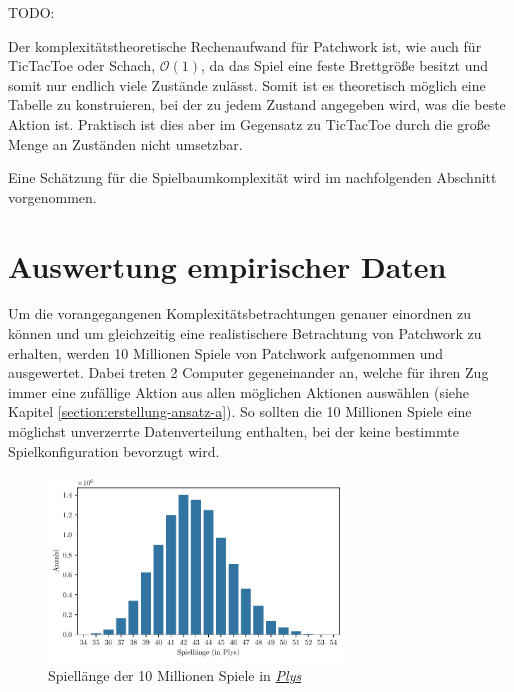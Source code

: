 TODO:

Der komplexitätstheoretische Rechenaufwand für Patchwork ist, wie auch für TicTacToe oder Schach, $\mathcal{O}(1)$, da das Spiel eine feste Brettgröße besitzt und somit nur endlich viele Zustände zulässt. Somit ist es theoretisch möglich eine Tabelle zu konstruieren, bei der zu jedem Zustand angegeben wird, was die beste Aktion ist. Praktisch ist dies aber im Gegensatz zu TicTacToe durch die große Menge an Zuständen nicht umsetzbar.

Eine Schätzung für die Spielbaumkomplexität wird im nachfolgenden Abschnitt vorgenommen.

\section{Auswertung empirischer Daten}

Um die vorangegangenen Komplexitätsbetrachtungen genauer einordnen zu können und um gleichzeitig eine realistischere Betrachtung von Patchwork zu erhalten, werden 10 Millionen Spiele von Patchwork aufgenommen und ausgewertet. Dabei treten 2 Computer gegeneinander an, welche für ihren Zug immer eine zufällige Aktion aus allen möglichen Aktionen auswählen (siehe Kapitel \ref{section:erstellung-ansatz-a}). So sollten die 10 Millionen Spiele eine möglichst unverzerrte Datenverteilung enthalten, bei der keine bestimmte Spielkonfiguration bevorzugt wird.

\begin{figure}[!ht]
    \centering
    \includegraphics[width=0.7\textwidth]{res/pictures/plots/game_lengths.pdf}
    \caption{Spiellänge der 10 Millionen Spiele in \hyperref[text:ply]{\emph{Plys}}}
    \label{fig:plot-game-length-10-million}
\end{figure}

